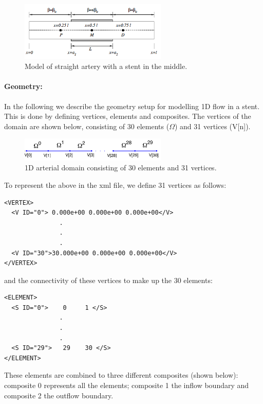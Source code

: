 \begin{figure}
\begin{center}
\includegraphics[width=7cm]{Figures/StentGeometry.png}
\caption{Model of straight artery with a stent in the middle.}
\end{center}
\end{figure}

\paragraph{Geometry:~} In the following we describe the geometry setup for modelling 1D flow in a stent. This is done by defining vertices, elements and composites. The vertices of the domain are shown below, consisting of 30 elements ($\Omega$) and 31 vertices (V[n]).

\begin{figure}
\begin{center}
\includegraphics[width=7cm]{Figures/StentDomain.png}
\caption{1D arterial domain consisting of 30 elements and 31 vertices.}
\end{center}
\end{figure}

To represent the above in the xml file, we define 31 vertices as follows:
\begin{lstlisting}[style=XMLStyle]
<VERTEX>
  <V ID="0"> 0.000e+00 0.000e+00 0.000e+00</V>
               .
               .
               . 
  <V ID="30">30.000e+00 0.000e+00 0.000e+00</V>
</VERTEX>
\end{lstlisting}
and the connectivity of these vertices to make up the 30 elements:
\begin{lstlisting}[style=XMLStyle]
<ELEMENT>
  <S ID="0">    0     1 </S>
               .
               .
               . 
  <S ID="29">   29    30 </S>
</ELEMENT>
\end{lstlisting}

These elements are combined to three different composites (shown below): composite 0 represents all the elements; composite 1 the inflow boundary and composite 2 the outflow boundary.
 
